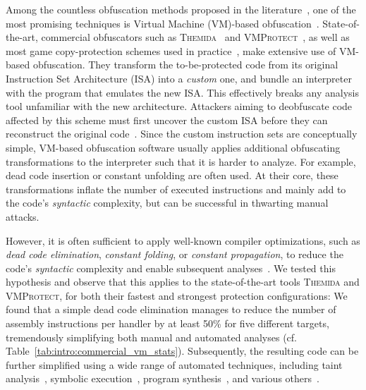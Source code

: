 \documentclass[letterpaper,twocolumn,10pt]{article}
\newcommand{\cf}{cf.\xspace}
\theoremstyle{customexample}
\theoremstyle{customexperiment}
\newcommand{\themida}{\textsc{Themida}\xspace}
\newcommand{\vmprotect}{\textsc{VMProtect}\xspace}
\begin{document}
Among the countless obfuscation methods proposed in the literature~\cite{collberg1997taxonomy,zhou2007information,obf-general,obf-probfuscation,obf-vmbased,obf-controlflow,obf-selfmodify,banescu2016code,wang2011linear,ollvm,xu2018manufacturing,ollivier2019howto,borrello2021hiding,suk2020vcf,xue2018exploiting,cheng2019dynopvm}, one of the most promising techniques is Virtual Machine (VM)-based obfuscation~\cite{rolles2009unpacking,obf-vmbased}. State-of-the-art, commercial obfuscators such as \themida~\cite{themida} and \vmprotect~\cite{vmprotect}, as well as most game copy-protection schemes used in practice~\cite{securom,denuvo}, make extensive use of VM-based obfuscation. They transform the to-be-protected code from its original Instruction Set Architecture (ISA) into a \emph{custom} one, and bundle an interpreter with the program that emulates the new ISA. This effectively breaks any analysis tool unfamiliar with the new architecture. Attackers aiming to deobfuscate code affected by this scheme must first uncover the custom ISA before they can reconstruct the original code~\cite{rolles2009unpacking,sharif2009automatic}.
Since the custom instruction sets are conceptually simple, VM-based obfuscation software usually applies additional obfuscating transformations to the interpreter such that it is harder to analyze. 
For example, dead code insertion or constant unfolding are often used.
At their core, these transformations inflate the number of executed instructions and mainly add to the code's \emph{syntactic} complexity, but can be successful in thwarting manual attacks.




However, it is often sufficient to apply well-known compiler optimizations, such as \emph{dead code elimination}, \emph{constant folding}, or \emph{constant propagation}, to reduce the code's \emph{syntactic} complexity and enable subsequent analyses~\cite{yadegari2015generic,saturn}. We tested this hypothesis and observe that this applies to the state-of-the-art tools \themida and \vmprotect, for both their fastest and strongest protection configurations: We found that a simple dead code elimination manages to reduce the number of assembly instructions per handler by at least 50\% for five different targets, tremendously simplifying both manual and automated analyses (\cf Table~\ref{tab:intro:commercial_vm_stats}). Subsequently, the resulting code can be further simplified using a wide range of automated techniques, including taint analysis~\cite{yadegari2014bit,yadegari2015generic}, symbolic execution~\cite{yadegari2015symbolic,yadegari2015generic}, program synthesis~\cite{blazytko2017syntia,david2020qsynth}, and various others~\cite{rolles2009unpacking,sharif2009automatic,coogan2011deobfuscation,kinder2012towards, barhelemy2016binary,eyrolles2016defeating,guinet2016arybo,bardin2017backward,eyrolles2017dissertation,liang2017deobfuscation,salwan2018symbolic,saturn}.
\end{document}
